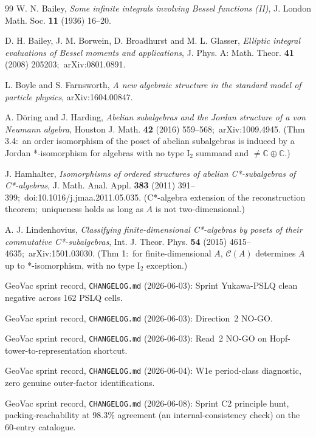 \documentclass[11pt,a4paper]{article}
\theoremstyle{plain}
\theoremstyle{definition}
\newcommand{\C}{\mathbb{C}}
\begin{document}
\begin{thebibliography}{99}
W. N. Bailey, \emph{Some infinite integrals involving Bessel functions (II)}, J. London Math. Soc. \textbf{11} (1936) 16--20.

D. H. Bailey, J. M. Borwein, D. Broadhurst and M. L. Glasser, \emph{Elliptic integral evaluations of Bessel moments and applications}, J. Phys. A: Math. Theor. \textbf{41} (2008) 205203;\ arXiv:0801.0891.

L. Boyle and S. Farnsworth, \emph{A new algebraic structure in the standard model of particle physics}, arXiv:1604.00847.

A. D\"oring and J. Harding, \emph{Abelian subalgebras and the Jordan structure of a von Neumann algebra}, Houston J. Math. \textbf{42} (2016) 559--568;\ arXiv:1009.4945.  (Thm 3.4:\ an order isomorphism of the poset of abelian subalgebras is induced by a Jordan *-isomorphism for algebras with no type I$_2$ summand and $\ne \C \oplus \C$.)

J. Hamhalter, \emph{Isomorphisms of ordered structures of abelian C*-subalgebras of C*-algebras}, J. Math. Anal. Appl. \textbf{383} (2011) 391--399;\ doi:10.1016/j.jmaa.2011.05.035.  (C*-algebra extension of the reconstruction theorem;\ uniqueness holds as long as $A$ is not two-dimensional.)

A. J. Lindenhovius, \emph{Classifying finite-dimensional C*-algebras by posets of their commutative C*-subalgebras}, Int. J. Theor. Phys. \textbf{54} (2015) 4615--4635;\ arXiv:1501.03030.  (Thm 1:\ for finite-dimensional $A$, $\mathcal{C}(A)$ determines $A$ up to *-isomorphism, with no type I$_2$ exception.)

GeoVac sprint record, \texttt{CHANGELOG.md} (2026-06-03):  Sprint Yukawa-PSLQ clean negative across 162 PSLQ cells.

GeoVac sprint record, \texttt{CHANGELOG.md} (2026-06-03):  Direction~2 NO-GO.

GeoVac sprint record, \texttt{CHANGELOG.md} (2026-06-03):  Read~2 NO-GO on Hopf-tower-to-representation shortcut.

GeoVac sprint record, \texttt{CHANGELOG.md} (2026-06-04):  W1e period-class diagnostic, zero genuine outer-factor identifications.

GeoVac sprint record, \texttt{CHANGELOG.md} (2026-06-08):  Sprint C2 principle hunt, packing-reachability at 98.3\% agreement (an internal-consistency check) on the 60-entry catalogue.


\end{thebibliography}
\end{document}

